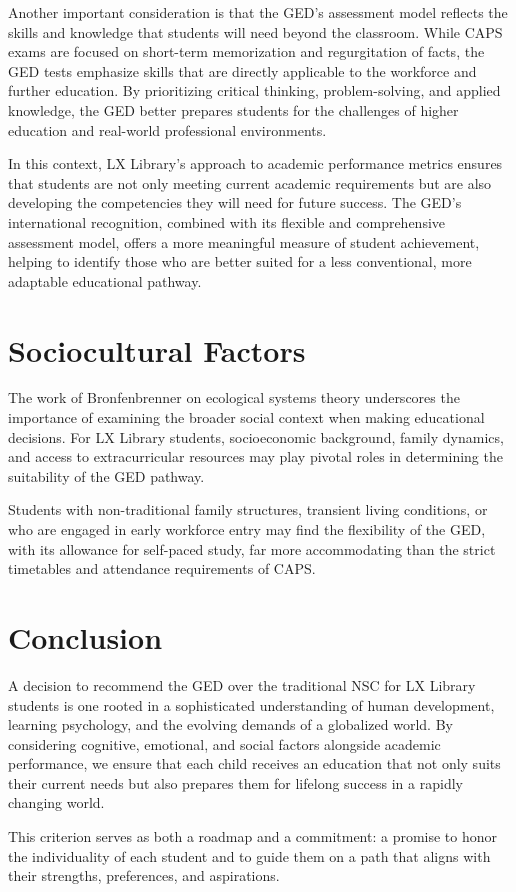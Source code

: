 \documentclass[12pt]{article}
\begin{document}
Another important consideration is that the GED’s assessment model reflects the skills and knowledge that students will need beyond the classroom. While CAPS exams are focused on short-term memorization and regurgitation of facts, the GED tests emphasize skills that are directly applicable to the workforce and further education. By prioritizing critical thinking, problem-solving, and applied knowledge, the GED better prepares students for the challenges of higher education and real-world professional environments.

In this context, LX Library’s approach to academic performance metrics ensures that students are not only meeting current academic requirements but are also developing the competencies they will need for future success. The GED's international recognition, combined with its flexible and comprehensive assessment model, offers a more meaningful measure of student achievement, helping to identify those who are better suited for a less conventional, more adaptable educational pathway.


\section{Sociocultural Factors}

The work of Bronfenbrenner on ecological systems theory underscores the importance of examining the broader social context when making educational decisions. For LX Library students, socioeconomic background, family dynamics, and access to extracurricular resources may play pivotal roles in determining the suitability of the GED pathway.

Students with non-traditional family structures, transient living conditions, or who are engaged in early workforce entry may find the flexibility of the GED, with its allowance for self-paced study, far more accommodating than the strict timetables and attendance requirements of CAPS.

\section{Conclusion}

A decision to recommend the GED over the traditional NSC for LX Library students is one rooted in a sophisticated understanding of human development, learning psychology, and the evolving demands of a globalized world. By considering cognitive, emotional, and social factors alongside academic performance, we ensure that each child receives an education that not only suits their current needs but also prepares them for lifelong success in a rapidly changing world.

This criterion serves as both a roadmap and a commitment: a promise to honor the individuality of each student and to guide them on a path that aligns with their strengths, preferences, and aspirations.

\vfill

\newpage
\printbibliography
\end{document}
